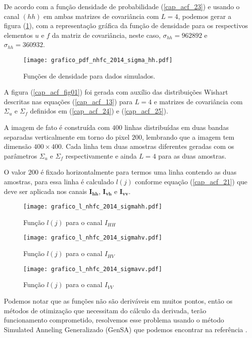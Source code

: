 De acordo com a função densidade de probabilidade (\ref{cap_acf_23}) e usando o canal $(hh)$ em ambas matrizes de covariância com $L=4$, podemos gerar a figura (\ref{cap_acf_fig02}), com a representação gráfica da função de densidade para os respectivos elementos $u$ e $f$ da matriz de covariância, neste caso, $\sigma_{hh}=962892$ e $\sigma_{hh}= 360932$. 

\begin{figure}[hbt]
	\centering
  \texttt{[image: grafico\_pdf\_nhfc\_2014\_sigma\_hh.pdf]}
	\caption{Funções de densidade para dados simulados.}\label{cap_acf_fig02}
\end{figure}

A figura (\ref{cap_acf_fig01}) foi gerada com auxílio das distribuições Wishart descritas nas equações (\ref{cap_acf_13}) para $L=4$ e matrizes de covariância com $\Sigma_{u}$ e $\Sigma_{f}$ definidos em (\ref{cap_acf_24}) e (\ref{cap_acf_25}).
	
A imagem de fato é construída com $400$ linhas distribuídas em duas bandas separadas verticalmente em torno do pixel $200$, lembrando que a imagem tem dimensão $400 \times 400$. Cada linha  tem duas amostras diferentes geradas com os parâmetros $\Sigma_{u}$ e $\Sigma_{f}$ respectivamente e ainda $L=4$ para as duas amostras.  

	O valor $200$ é fixado horizontalmente para termos uma linha contendo as duas amostras, para essa linha é calculado $l(j)$ conforme equação (\ref{cap_acf_21}) que deve ser aplicada nos canais $\mathbf{I_{hh}}$, $\mathbf{I_{vh}}$ e $\mathbf{I_{vv}}$.  
\begin{figure}[hbt]
  \texttt{[image: grafico\_l\_nhfc\_2014\_sigmahh.pdf]}
	\caption{Função $l(j)$ para o canal $I_{HH}$}\label{cap_acf_fig04}
\endminipage\hfill
{}
  \texttt{[image: grafico\_l\_nhfc\_2014\_sigmahv.pdf]}
	\caption{Função $l(j)$ para o canal $I_{HV}$}\label{cap_acf_fig05}
\endminipage\hfill
\centering
{}
  \texttt{[image: grafico\_l\_nhfc\_2014\_sigmavv.pdf]}
	\caption{Função $l(j)$ para o canal $I_{VV}$}\label{cap_acf_fig06}
\endminipage\hfill
\end{figure}

	Podemos notar que as funções não são deriváveis em muitos pontos, então os métodos de otimização que necessitam do cálculo da derivada, terão funcionamento comprometido, resolvemos esse problema usando o método Simulated Anneling Generalizado (GenSA) que podemos encontrar na referência \citep{xgsh}.
	
